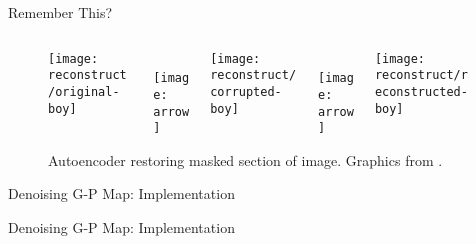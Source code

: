 \begin{frame}{Remember This?}
  \vspace{6ex}
  \begin{figure}
  \begin{columns}
  \begin{column}{0.3\textwidth}
  \texttt{[image: reconstruct/original-boy]}
  \end{column}
  \begin{column}{0.05\textwidth}
  \centering
  \\
  \texttt{[image: arrow]}
  \end{column}
  \begin{column}{0.3\textwidth}
  \texttt{[image: reconstruct/corrupted-boy]}
  \end{column}
  \begin{column}{0.05\textwidth}
  \centering
  \\
  \texttt{[image: arrow]}
  \end{column}
  \begin{column}{0.3\textwidth}
  \texttt{[image: reconstruct/reconstructed-boy]}
  \end{column}
  \end{columns}
  \vspace{1ex}
  \caption{
  Autoencoder restoring masked section of image.
  Graphics from \cite{allen2018generative}.
  }
  \end{figure}

\end{frame}

\begin{frame}{Denoising G-P Map: Implementation}



\end{frame}

\begin{frame}{Denoising G-P Map: Implementation}



\end{frame}

